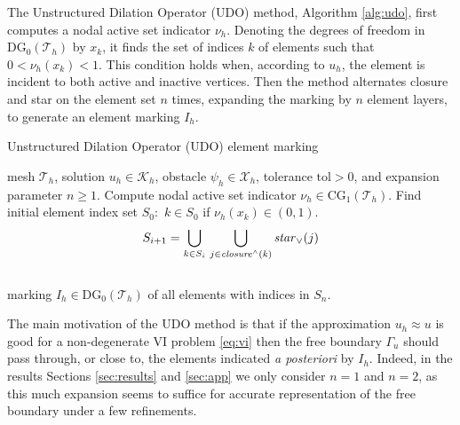 \documentclass[]{interact}
\theoremstyle{plain}%
\theoremstyle{definition}
\theoremstyle{remark}
\newcommand{\cK}{\mathcal{K}}
\newcommand{\cT}{\mathcal{T}}
\newcommand{\cX}{\mathcal{X}}
\newcommand{\CG}{\text{CG}}
\newcommand{\DG}{\text{DG}}
\begin{document}
The Unstructured Dilation Operator (UDO) method, Algorithm \ref{alg:udo}, first computes a nodal active set indicator $\nu_h$.  Denoting the degrees of freedom in $\DG_0(\cT_h)$ by $x_k$, it finds the set of indices $k$ of elements such that $0<\nu_h(x_k)<1$.  This condition holds when, according to $u_h$, the element is incident to both active and inactive vertices.  Then the method alternates closure and star on the element set $n$ times, expanding the marking by $n$ element layers, to generate an element marking $I_h$.

\begin{algorithm}[ht]
	\caption{Unstructured Dilation Operator (UDO) element marking}
	\begin{algorithmic}[1]
		\Require mesh $\cT_h$, solution $u_h \in \cK_h$, obstacle $\psi_h \in \cX_h$, tolerance $\text{tol} > 0$, and expansion parameter $n\ge 1$.
		\State Compute nodal active set indicator $\nu_h \in \CG_1(\cT_h)$.
		\State Find initial element index set $S_0$: \,$k\in S_0$ if $\nu_h(x_k) \in (0,1)$.
		    $$S_{i+1} = \bigcup_{k\in S_i}\, \bigcup_{j\in \text{\emph{closure}}^\wedge(k)} \text{\emph{star}}_\vee(j)$$
		\EndFor \\
		\Return marking $I_h \in \DG_0(\cT_h)$ of all elements with indices in $S_n$.
	\end{algorithmic}
\label{alg:udo}
\end{algorithm}

The main motivation of the UDO method is that if the approximation $u_h\approx u$ is good for a non-degenerate VI problem \eqref{eq:vi} then the free boundary $\Gamma_u$ should pass through, or close to, the elements indicated \emph{a posteriori} by $I_h$.  Indeed, in the results Sections \ref{sec:results} and \ref{sec:app} we only consider $n=1$ and $n=2$, as this much expansion seems to suffice for accurate representation of the free boundary under a few refinements.
\end{document}
